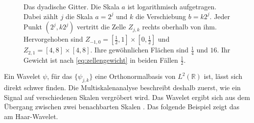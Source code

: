 \documentclass[a4paper,11pt,bibliography=totoc,listof=totoc,headinclude=true,cleardoublepage=empty,oneside]{scrbook}
\theoremstyle{plain}
\theoremstyle{definition}
\newcommand{\R}{\mathbb{R}}
\newcommand{\LZwei}{L^2(\R)}
\begin{document}
\begin{figure}[htbp]
  \centering
  \caption[Das dyadische Gitter]{Das dyadische Gitter. Die Skala $a$ ist
  logarithmisch aufgetragen. Dabei zählt $j$ die Skala $a = 2^j$ und $k$ die
  Verschiebung $b = k2^j$. Jeder Punkt $(2^j,k2^j)$ vertritt die Zelle
  $Z_{j,k}$ rechts oberhalb von ihm. Hervorgehoben sind
  $Z_{-1,0} = [\tfrac12,1]\times[0,\tfrac12]$ und $Z_{2,1} = [4,8]\times[4,8]$.
  Ihre gewöhnlichen Flächen sind $\tfrac14$ und $16$. Ihr Gewicht ist nach
  \eqref{eq:zellengewicht} in beiden Fällen $\tfrac12$.}
  \label{fig:dyadisches-gitter}
\end{figure}
 
Ein Wavelet $\psi$, für das $\{\psi_{j,k}\}$ eine Orthonormalbasis von $\LZwei$
ist, lässt sich direkt schwer finden. Die 
Multiskalenanalyse beschreibt deshalb zuerst, wie ein Signal auf verschiedenen
Skalen vergröbert wird. Das Wavelet ergibt sich aus dem Übergang zwischen zwei
benachbarten Skalen \cite[Kap.~5.1]{blatter}. %
Das folgende Beispiel zeigt das am Haar-Wavelet.
\end{document}
